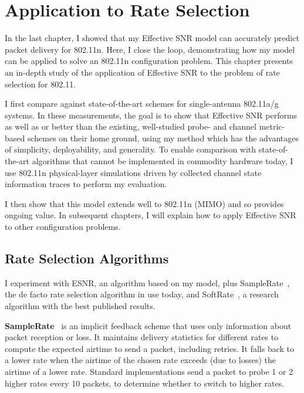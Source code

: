 \ifx\mainfile\undefined

\setcounter{chapter}{6} %
\fi

\cleardoublepage
\chapter{Application to Rate Selection}
\label{chap:rate}

In the last chapter, I showed that my Effective SNR model can accurately predict packet delivery for 802.11n. Here, I close the loop, demonstrating how my model can be applied to solve an 802.11n configuration problem. This chapter presents an in-depth study of the application of Effective SNR to the problem of rate selection for 802.11.

I first compare against state-of-the-art schemes for single-antenna 802.11a/g systems. In these measurements, the goal is to show that Effective SNR performs as well as or better than the existing, well-studied probe- and channel metric-based schemes on their home ground, using my method which has the advantages of simplicity, deployability, and generality. To enable comparison with state-of-the-art algorithms that cannot be implemented in commodity hardware today, I use 802.11n physical-layer simulations driven by collected channel state information traces to perform my evaluation.

I then show that this model extends well to 802.11n (MIMO) and so provides ongoing value. In subsequent chapters, I will explain how to apply Effective SNR to other configuration problems.


\section{Rate Selection Algorithms}
I experiment with ESNR, an algorithm based on my model, plus SampleRate~\cite{Bicket_SampleRate}, the de facto rate selection algorithm in use today, and SoftRate~\cite{Vutukuru_SoftRate}, a research algorithm with the best published results.

\textbf{SampleRate}~\cite{Bicket_SampleRate} is an implicit feedback scheme that uses only information about packet reception or loss.
It maintains delivery statistics for different rates to compute the expected airtime to send a packet, including retries.
It falls back to a lower rate when the airtime of the chosen rate exceeds (due to losses) the airtime of a lower rate.
Standard implementations send a packet to probe 1 or 2 higher rates every 10 packets, to determine whether to switch to higher rates.

